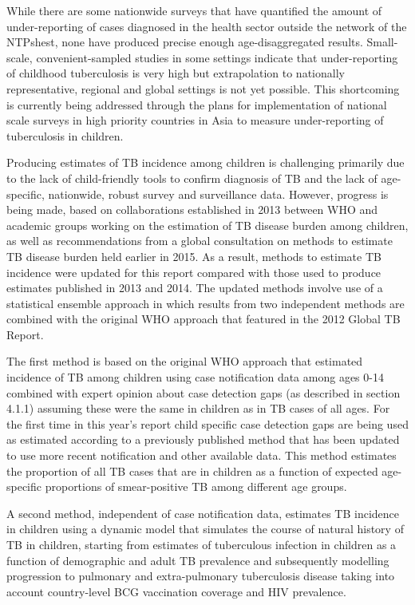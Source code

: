 While there are some nationwide surveys that have quantified the amount of under-reporting of cases diagnosed in the health sector outside the network of the NTPs\cite{20487611}\cite{17156496}hest\cite{18346285}, none have produced precise enough age-disaggregated results. Small-scale, convenient-sampled studies in some settings indicate that under-reporting of childhood tuberculosis is very high\cite{21985569}\cite{Coghlan2015-xn} but extrapolation to nationally representative, regional and global settings is not yet possible. This shortcoming is currently being addressed through the plans for implementation of national scale surveys in high priority countries in Asia to measure under-reporting of tuberculosis in children\cite{noauthor_2014-gv}.

Producing estimates of TB incidence among children is challenging primarily due to the lack of child-friendly tools to confirm diagnosis of TB and the lack of age-specific, nationwide, robust survey and surveillance data. However, progress is being made, based on collaborations established in 2013 between WHO and academic groups working on the estimation of TB disease burden among children, as well as recommendations from a global consultation on methods to estimate TB disease burden held earlier in 2015. As a result, methods to estimate TB incidence were updated for this report compared with those used to produce estimates published in 2013 and 2014. The updated methods involve use of a statistical ensemble approach in which results from two independent methods are combined with the original WHO approach that featured in the 2012 Global TB Report. 

The first method is based on the original WHO approach that estimated incidence of TB among children using case notification data among ages 0-14 combined with expert opinion about case detection gaps (as described in section 4.1.1) assuming these were the same in children as in TB cases of all ages. For the first time in this year’s report child specific case detection gaps are being used as estimated according to a previously published method\cite{Jenkins_2014} that has been updated to use more recent notification and other available data\cite{Sismanidis_2014}. This method estimates the proportion of all TB cases that are in children as a function of expected age-specific proportions of smear-positive TB among different age groups. 

A second method, independent of case notification data, estimates TB incidence in children using a dynamic model that simulates the course of natural history of TB in children, starting from estimates of tuberculous infection in children as a function of demographic and adult TB prevalence and subsequently modelling progression to pulmonary and extra-pulmonary tuberculosis disease taking into account country-level BCG vaccination coverage and HIV prevalence\cite{Dodd_2014}. 

